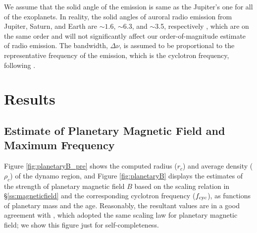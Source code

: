 \documentclass[iop,numberedappendix,apj]{emulateapj}
\def\memoDS#1{\color{blue}$[${\bf #1}$]$ \color{black}}
\begin{document}

We assume that the solid angle of the emission is same as the Jupiter's one for all of the exoplanets.
In reality, the solid angles of auroral radio emission from  Jupiter, Saturn, and Earth are $\sim 1.6$, $\sim $6.3, and $\sim $3.5, respectively \citep{desch+kaiser1984}, which are on the same order and will not significantly affect our order-of-magnitude estimate of radio emission. 
The bandwidth, $\Delta \nu$, is assumed to be proportional to the representative frequency of the emission, which is the cyclotron frequency, following \citet{griesmeier2007b}.



\section{Results}
\label{s:result}

\subsection{Estimate of Planetary Magnetic Field and Maximum Frequency}
\label{ss:Bplanet}

Figure \ref{fig:planetaryB_pre} shows the computed radius ($r_c$) and average density ($\rho_c$) of the dynamo region, and Figure \ref{fig:planetaryB} displays the estimates of the strength of planetary magnetic field $B$ based on the scaling relation in \S\ref{ss:magneticfield} and the corresponding cyclotron frequency ($f_{\rm cyc}$), as functions of planetary mass and the age. 
Reasonably, the resultant values are in a good agreement with \citet{reiners2010}, which adopted the same scaling law for planetary magnetic field; we show this figure just for self-completeness. 
\end{document}
